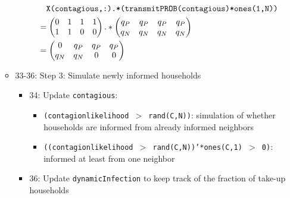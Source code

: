 \documentclass[10pt,letterpaper]{article}
\begin{document}
\begin{itemize}
\begin{itemize}
\begin{itemize}
            \begin{align*}
              &\quad \text{\texttt{X(contagious,:).*(transmitPROB(contagious)*ones(1,N))}} \\
              &= 
            \begin{pmatrix}
              0 & 1 & 1 & 1 \\
              1 & 1 & 0 & 0
            \end{pmatrix} .* 
            \begin{pmatrix}
              q_P & q_P & q_P & q_P \\
              q_N & q_N & q_N & q_N
            \end{pmatrix} \\
              &= \begin{pmatrix}
              0 & q_P & q_P & q_P \\
              q_N & q_N & 0 & 0
            \end{pmatrix}
            \end{align*}        
        \end{itemize}
      \item 33-36: Step 3: Simulate newly informed households
        \begin{itemize}
          \item 34: Update \texttt{contagious}:
            \begin{itemize}
              \item \texttt{(contagionlikelihood $>$ rand(C,N))}: simulation of whether households are informed from already informed neighbors
              \item \texttt{((contagionlikelihood $>$ rand(C,N))'*ones(C,1) $>$ 0)}: informed at least from one neighbor
            \end{itemize}
          \item 36: Update \texttt{dynamicInfection} to keep track of the fraction of take-up households
        \end{itemize}
    \end{itemize}
\end{itemize}




\clearpage
%
%
\end{document}
